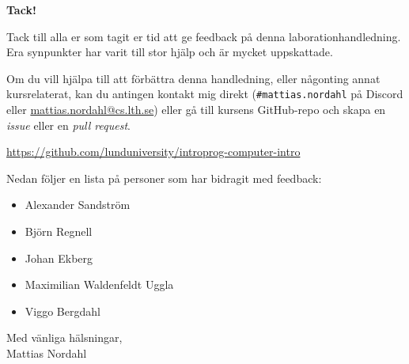\begin{center}
    \vspace*{1cm}
    \Large\textbf{Tack!}
    \vspace{0.5cm}
\end{center}

\noindent
Tack till alla er som tagit er tid att ge feedback på denna laborationhandledning. Era synpunkter har varit till stor hjälp och är mycket uppskattade.

\blankline

\noindent
Om du vill hjälpa till att förbättra denna handledning, eller någonting annat kursrelaterat, kan du antingen kontakt mig direkt (\texttt{\#mattias.nordahl} på Discord eller \url{mattias.nordahl@cs.lth.se}) eller gå till kursens GitHub-repo och skapa en \textit{issue} eller en \textit{pull request}.

\halfblankline

\url{https://github.com/lunduniversity/introprog-computer-intro}

\blankline

\noindent
Nedan följer en lista på personer som har bidragit med feedback:

\begin{itemize}[label={},itemsep=1mm,parsep=0mm]
    \item Alexander Sandström
    \item Björn Regnell
    \item Johan Ekberg
    \item Maximilian Waldenfeldt Uggla
    \item Viggo Bergdahl
\end{itemize}

\vspace{0.5cm}
\begin{flushright}
    Med vänliga hälsningar,\\
    Mattias Nordahl
\end{flushright}